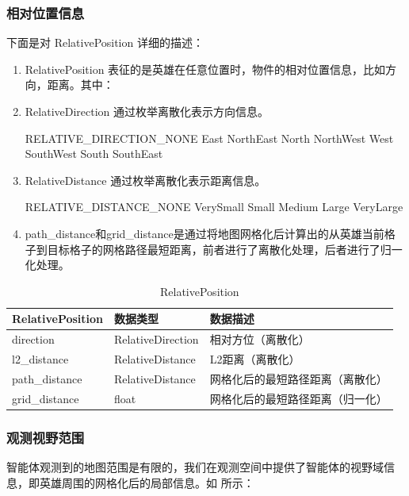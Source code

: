 \subsubsection{相对位置信息}

下面是对  RelativePosition 详细的描述：

\begin{enumerate}
\item RelativePosition 表征的是英雄在任意位置时，物件的相对位置信息，比如方向，距离。其中：
\item RelativeDirection 通过枚举离散化表示方向信息。

RELATIVE\_DIRECTION\_NONE East NorthEast North NorthWest West SouthWest South SouthEast

\item RelativeDistance 通过枚举离散化表示距离信息。

RELATIVE\_DISTANCE\_NONE VerySmall Small Medium Large VeryLarge

\item path\_distance和grid\_distance是通过将地图网格化后计算出的从英雄当前格子到目标格子的网格路径最短距离，前者进行了离散化处理，后者进行了归一化处理。
\end{enumerate}


\begin{table}[H]
    \begin{tabularx}{1\textwidth}{l l X } %
        \hline %
        \textbf{RelativePosition} & \textbf{数据类型} & \textbf{数据描述}  \\
        \hline
        direction&RelativeDirection&相对方位（离散化）\\
        l2\_distance&RelativeDistance&L2距离（离散化）\\
        path\_distance&RelativeDistance&网格化后的最短路径距离（离散化）\\
        grid\_distance&float&网格化后的最短路径距离（归一化）        \\
        \hline
    \end{tabularx}

    \centering
    \caption{RelativePosition}
    \label{rel-pos}
\end{table}


\subsubsection{观测视野范围}

智能体观测到的地图范围是有限的，我们在观测空间中提供了智能体的视野域信息，即英雄周围的网格化后的局部信息。如  所示：

